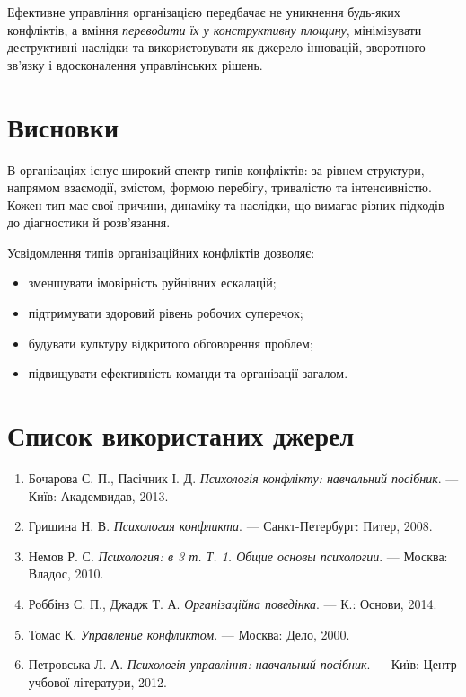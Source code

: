 \documentclass[12pt,a4paper]{article}
\begin{document}
    Ефективне управління організацією передбачає не уникнення будь-яких конфліктів, 
    а вміння \textit{переводити їх у конструктивну площину}, мінімізувати деструктивні наслідки та 
    використовувати як джерело інновацій, зворотного зв’язку і вдосконалення управлінських рішень.

    \section*{Висновки}
    В організаціях існує широкий спектр типів конфліктів: за рівнем структури, напрямом взаємодії, змістом, формою перебігу, 
    тривалістю та інтенсивністю. 
    Кожен тип має свої причини, динаміку та наслідки, що вимагає різних підходів до діагностики й розв’язання.

    Усвідомлення типів організаційних конфліктів дозволяє:
    \begin{itemize}
        \item зменшувати імовірність руйнівних ескалацій;
        \item підтримувати здоровий рівень робочих суперечок;
        \item будувати культуру відкритого обговорення проблем;
        \item підвищувати ефективність команди та організації загалом.
    \end{itemize}

    \section*{Список використаних джерел}
    \begin{enumerate}
        \item Бочарова С. П., Пасічник І. Д. \textit{Психологія конфлікту: навчальний посібник}. --- Київ: Академвидав, 2013.
        \item Гришина Н. В. \textit{Психология конфликта}. --- Санкт-Петербург: Питер, 2008.
        \item Немов Р. С. \textit{Психология: в 3 т. Т. 1. Общие основы психологии}. --- Москва: Владос, 2010.
        \item Роббінз С. П., Джадж Т. А. \textit{Організаційна поведінка}. --- К.: Основи, 2014.
        \item Томас К. \textit{Управление конфликтом}. --- Москва: Дело, 2000.
        \item Петровська Л. А. \textit{Психологія управління: навчальний посібник}. --- Київ: Центр учбової літератури, 2012.
    \end{enumerate}
\end{document}
